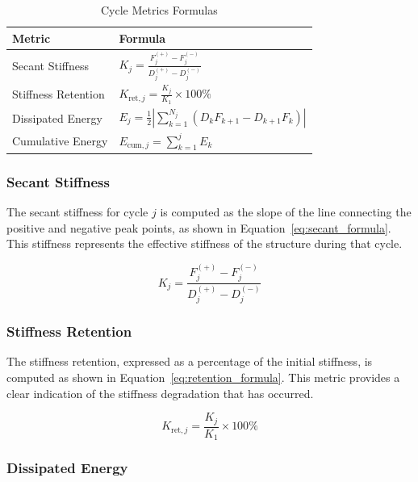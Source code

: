 \documentclass[11pt,a4paper]{article}
\begin{document}
\begin{table}[h]
\centering
\caption{Cycle Metrics Formulas}\label{tab:metrics_formulas}
\begin{tabular}{p{4cm}p{10cm}}
\toprule
\textbf{Metric} & \textbf{Formula} \\
\midrule
Secant Stiffness & \(K_j = \frac{F_j^{(+)} - F_j^{(-)}}{D_j^{(+)} - D_j^{(-)}}\) \\
Stiffness Retention & \(K_{\text{ret},j} = \frac{K_j}{K_1} \times 100\%\) \\
Dissipated Energy & \(E_j = \frac{1}{2} \left| \sum_{k=1}^{N_j} (D_k F_{k+1} - D_{k+1} F_k) \right|\) \\
Cumulative Energy & \(E_{\text{cum},j} = \sum_{k=1}^{j} E_k\) \\
\bottomrule
\end{tabular}
\end{table}

\subsubsection{Secant Stiffness}

The secant stiffness for cycle \(j\) is computed as the slope of the line connecting the positive and negative peak points, as shown in Equation~\ref{eq:secant_formula}. This stiffness represents the effective stiffness of the structure during that cycle.

\begin{equation}
K_j = \frac{F_j^{(+)} - F_j^{(-)}}{D_j^{(+)} - D_j^{(-)}}
\label{eq:secant_formula}
\end{equation}

\subsubsection{Stiffness Retention}

The stiffness retention, expressed as a percentage of the initial stiffness, is computed as shown in Equation~\ref{eq:retention_formula}. This metric provides a clear indication of the stiffness degradation that has occurred.

\begin{equation}
K_{\text{ret},j} = \frac{K_j}{K_1} \times 100\%
\label{eq:retention_formula}
\end{equation}

\subsubsection{Dissipated Energy}
\end{document}
